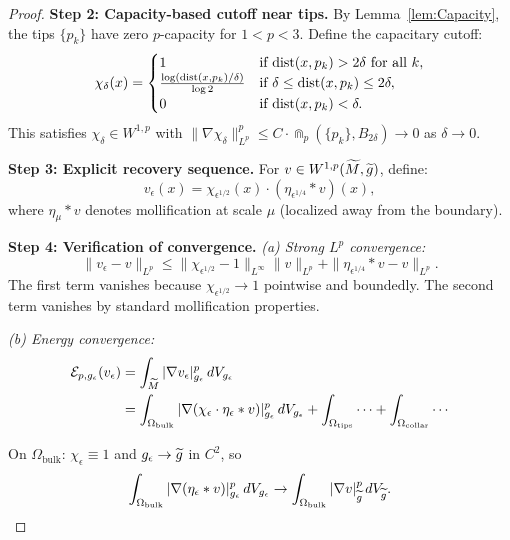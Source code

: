 \begin{proof}
\textbf{Step 2: Capacity-based cutoff near tips.}
By Lemma~\ref{lem:Capacity}, the tips $\{p_k\}$ have zero $p$-capacity for $1 < p < 3$. Define the capacitary cutoff:
\begin{equation}
    \chi_\delta(x) = \begin{cases}
        1 & \text{if } \mathrm{dist}(x, p_k) > 2\delta \text{ for all } k, \\
        \frac{\log(\mathrm{dist}(x,p_k)/\delta)}{\log 2} & \text{if } \delta \le \mathrm{dist}(x, p_k) \le 2\delta, \\
        0 & \text{if } \mathrm{dist}(x, p_k) < \delta.
    \end{cases}
\end{equation}
This satisfies $\chi_\delta \in W^{1,p}$ with $\|\nabla \chi_\delta\|_{L^p}^p \le C \cdot \Cap_p(\{p_k\}, B_{2\delta}) \to 0$ as $\delta \to 0$.

\textbf{Step 3: Explicit recovery sequence.}
For $v \in W^{1,p}(\widetilde{M}, \widetilde{g})$, define:
\begin{equation}
    v_\epsilon(x) = \chi_{\epsilon^{1/2}}(x) \cdot (\eta_{\epsilon^{1/4}} * v)(x),
\end{equation}
where $\eta_\mu * v$ denotes mollification at scale $\mu$ (localized away from the boundary).

\textbf{Step 4: Verification of convergence.}
\textit{(a) Strong $L^p$ convergence:}
\begin{equation}
    \|v_\epsilon - v\|_{L^p} \le \|\chi_{\epsilon^{1/2}} - 1\|_{L^\infty} \|v\|_{L^p} + \|\eta_{\epsilon^{1/4}} * v - v\|_{L^p}.
\end{equation}
The first term vanishes because $\chi_{\epsilon^{1/2}} \to 1$ pointwise and boundedly. The second term vanishes by standard mollification properties.

\textit{(b) Energy convergence:}
\begin{align}
    \mathcal{E}_{p,g_{\epsilon}}(v_\epsilon) &= \int_{\widetilde{M}} |\nabla v_\epsilon|^p_{g_{\epsilon}} \, dV_{g_{\epsilon}} \\
    &= \int_{\Omega_{\text{bulk}}} |\nabla(\chi_\epsilon \cdot \eta_\epsilon * v)|^p_{g_{\epsilon}} \, dV_{g_{\epsilon}} + \int_{\Omega_{\text{tips}}} \cdots + \int_{\Omega_{\text{collar}}} \cdots
\end{align}

On $\Omega_{\text{bulk}}$: $\chi_\epsilon \equiv 1$ and $g_{\epsilon} \to \widetilde{g}$ in $C^2$, so
\begin{equation}
    \int_{\Omega_{\text{bulk}}} |\nabla(\eta_\epsilon * v)|^p_{g_{\epsilon}} \, dV_{g_{\epsilon}} \to \int_{\Omega_{\text{bulk}}} |\nabla v|^p_{\widetilde{g}} \, dV_{\widetilde{g}}.
\end{equation}


\end{proof}
